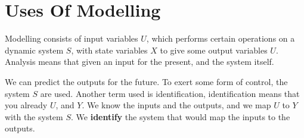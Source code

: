 \documentclass[11pt]{report}
\begin{document}
\section{Uses Of Modelling}
\label{sec:org9b928cb}
Modelling consists of input variables \(U\), which performs certain operations on a dynamic system \(S\), with state variables \(X\) to give some output variables \(U\).
Analysis means that given an input for the present, and the system itself.

We can predict the outputs for the future. To exert some form of control, the system \(S\) are used. Another term used is identification, identification means that you already \(U\), and \(Y\). We know the inputs and the outputs, and we map \(U\) to \(Y\) with the system \(S\). We \textbf{identify} the system that would map the inputs to the outputs.
\end{document}
